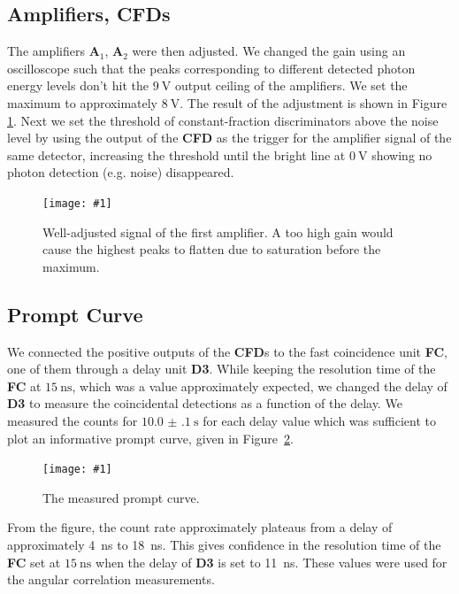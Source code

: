 \documentclass[twocolumn]{article}
\newcommand{\insertFigure}[1]{%
   \texttt{[image: \#1]}%
}
\begin{document}
\subsection{Amplifiers, CFDs}
The amplifiers \textbf{A$_1$}, \textbf{A$_2$} were then adjusted. We changed the gain using an oscilloscope such that the peaks corresponding to different detected photon energy levels don't hit the $\SI{9}{\volt}$ output ceiling of the amplifiers. We set the maximum to approximately $\SI{8}{\volt}$. The result of the adjustment is shown in Figure \ref{fig:amp}. Next we set the threshold of constant-fraction discriminators above the noise level by using the output of the \textbf{CFD} as the trigger for the amplifier signal of the same detector, increasing the threshold until the bright line at $\SI{0}{\volt}$ showing no photon detection (e.g. noise) disappeared. 
\begin{figure}[!h]
	\centering
	\insertFigure{./screenshots/SC08_cropped.png}
	\caption{Well-adjusted signal of the first amplifier. A too high gain would cause the highest peaks to flatten due to saturation before the maximum.} 
	\label{fig:amp}
\end{figure}

\subsection{Prompt Curve}
We connected the positive outputs of the \textbf{CFD}s to the fast coincidence unit \textbf{FC}, one of them through a delay unit \textbf{D3}. While keeping the resolution time of the \textbf{FC} at $\SI{15}{\nano\second}$, which was a value approximately expected, we changed the delay of \textbf{D3} to measure the coincidental detections as a function of the delay. We measured the counts for $\SI[separate-uncertainty = true]{10.0(1) }{\second}$ for each delay value which was sufficient to plot an informative prompt curve, given in Figure~\ref{fig:promt}. 
\begin{figure}[!h]
	\centering
	\insertFigure{prompt_cropped.png}
	\caption{The measured prompt curve.}
	\label{fig:promt}
\end{figure}
From the figure, the count rate approximately plateaus from a delay of approximately 4~ns to 18~ns. This gives confidence in the resolution time of the \textbf{FC} set at $\SI{15}{\nano\second}$ when the delay of \textbf{D3} is set to 11~ns. These values were used for the angular correlation measurements.
\end{document}
